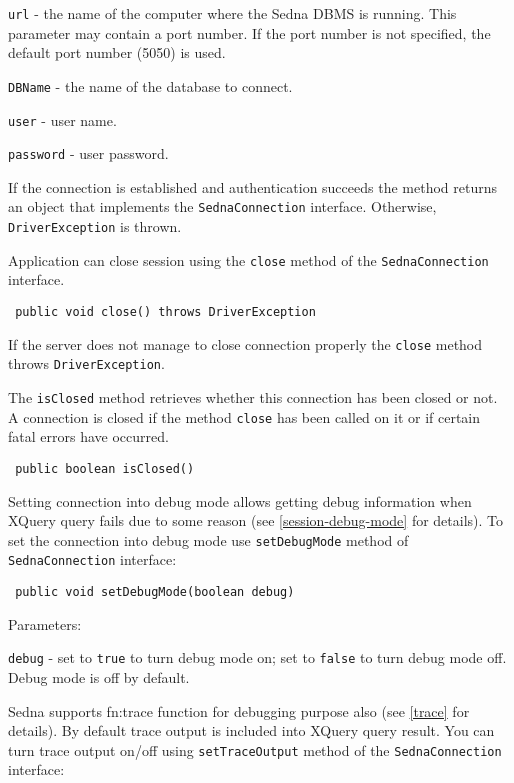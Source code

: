 \documentclass[a4paper,12pt]{article}
\begin{document}
 \verb!url! - the name of the computer where the Sedna DBMS is running. This parameter may contain a port number. If the port number is not specified, the default port number (5050) is used.

 \verb!DBName! - the name of the database to connect.

 \verb!user! - user name.

 \verb!password! - user password.

If the connection is established and authentication succeeds the method returns an object that implements the \verb!SednaConnection! interface. Otherwise, \verb!DriverException! is thrown.

Application can close session using the \verb!close! method of the \verb!SednaConnection! interface.

\begin{verbatim}
 public void close() throws DriverException
\end{verbatim}

If the server does not manage to close connection properly the \verb!close! method throws \verb!DriverException!.

The \verb!isClosed! method retrieves whether this connection has been closed or not. A connection is closed if the method \verb!close! has been called on it or if certain fatal errors have occurred.

\begin{verbatim}
 public boolean isClosed()
\end{verbatim}

Setting connection into debug mode allows getting debug information when XQuery query fails due to some reason (see \ref{session-debug-mode} for details). To set the connection into debug mode use \verb!setDebugMode! method of \verb!SednaConnection! interface:

\begin{verbatim}
 public void setDebugMode(boolean debug)
\end{verbatim}

Parameters:

 \verb!debug! - set to \verb!true! to turn debug mode on; set to \verb!false! to turn debug mode off. Debug mode is off by default.

Sedna supports fn:trace function for debugging purpose also (see \ref{trace} for details). By default trace output is included into XQuery query result. You can turn trace output on/off using \verb!setTraceOutput! method of the \verb!SednaConnection! interface:
\end{document}
